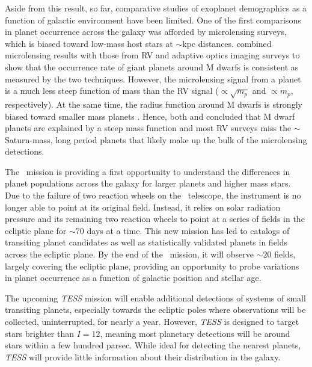 Aside from this result, so far, comparative studies of exoplanet
demographics as a function of galactic environment have been limited.
One of the first comparisons in planet occurrence across the galaxy
was afforded by microlensing surveys, which is biased toward low-mass
host stars at $\sim$kpc distances. 
\citet{Clanton14b} 
combined microlensing results
\citep[e.g.][]{Sumi10,Gould10,Cassan12} with those from RV and 
adaptive optics imaging surveys
\citep{Montet14} to show that the occurrence rate of giant
planets around M dwarfs is consistent as measured by the two
techniques. However, the microlensing signal from a planet is a much
less steep function of mass than the RV signal ($\propto \sqrt{m_p}$
and $\propto m_p$, respectively). At the
same time, the radius function around M dwarfs is strongly biased toward
smaller mass planets \citep{Swift13, Morton14}. Hence,
both \citet{Clanton14b} and \citet{Montet14} concluded that M dwarf planets
are explained by a steep mass function and most RV surveys miss the
$\sim$Saturn-mass, long period planets that likely make up the bulk of
the microlensing detections.

The \KT\ mission is providing a first opportunity to understand the
differences in planet populations across the galaxy for larger planets
and higher mass stars.  Due to the failure of two reaction wheels on
the \kep\ telescope, the instrument is no longer able to point at its
original field.  Instead, it relies on solar radiation pressure and
its remaining two reaction wheels to point at a series of fields in
the ecliptic plane for $\sim 70$ days at a time.  This new mission has
led to catalogs of transiting planet candidates
\citep{Foreman-Mackey15, Vanderburg16} as well as statistically
validated planets \citep{Montet15b} in fields across the ecliptic
plane.  By the end of the \KT\ mission, it will observe $\sim 20$
fields, largely covering the ecliptic plane, providing an opportunity
to probe variations in planet occurrence as a function of galactic
position and stellar age.

The upcoming \textit{TESS} mission \citep{Ricker14} will enable additional
detections of systems of small transiting planets, especially towards
the ecliptic poles where observations will be collected,
uninterrupted, for nearly a year.  However, \textit{TESS} is designed to
target stars brighter than $I = 12$, meaning most planetary detections
will be around stars within a few hundred parsec.  While ideal for
detecting the nearest planets, \textit{TESS} will provide little information
about their distribution in the galaxy.

